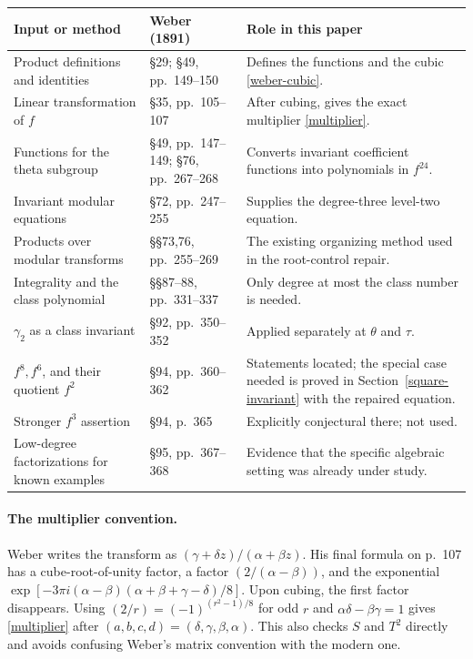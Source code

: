 \documentclass[11pt]{article}
\begin{document}
\begin{center}
\small
\begin{tabular}{>{\raggedright\arraybackslash}p{}
 >{\raggedright\arraybackslash}p{}
 >{\raggedright\arraybackslash}p{}}
\toprule
Input or method&Weber (1891)&Role in this paper\\
\midrule
Product definitions and identities&\S29; \S49,
pp.~149--150&Defines the functions and the cubic
\eqref{weber-cubic}.\\[4pt]
Linear transformation of \(f\)&\S35, pp.~105--107&After cubing,
gives the exact multiplier \eqref{multiplier}.\\[4pt]
Functions for the theta subgroup&\S49, pp.~147--149;
\S76, pp.~267--268&Converts invariant coefficient functions into
polynomials in \(f^{24}\).\\[4pt]
Invariant modular equations&\S72, pp.~247--255&Supplies the
degree-three level-two equation.\\[4pt]
Products over modular transforms&\S\S73,76, pp.~255--269&The
existing organizing method used in the root-control repair.\\[4pt]
Integrality and the class polynomial&\S\S87--88,
pp.~331--337&Only degree at most the class number is needed.\\[4pt]
\(\gamma_2\) as a class invariant&\S92,
pp.~350--352&Applied separately at \(\theta\) and \(\tau\).\\[4pt]
\(f^8,f^6\), and their quotient \(f^2\)&\S94,
pp.~360--362&Statements located; the special case needed is proved
in Section~\ref{square-invariant} with the repaired equation.\\[4pt]
Stronger \(f^3\) assertion&\S94, p.~365&Explicitly conjectural
there; not used.\\[4pt]
Low-degree factorizations for known examples&\S95, pp.~367--368&
Evidence that the specific algebraic setting was already under study.\\
\bottomrule
\end{tabular}
\end{center}

\paragraph{The multiplier convention.}
Weber writes the transform as
\((\gamma+\delta z)/(\alpha+\beta z)\). His final formula
on p.~107 has a cube-root-of-unity factor, a factor
\((2/(\alpha-\beta))\), and the exponential
\(\exp[-3\pi i(\alpha-\beta)(\alpha+\beta+\gamma-\delta)/8]\).
Upon cubing, the first factor disappears. Using
\((2/r)=(-1)^{(r^2-1)/8}\) for odd \(r\) and
\(\alpha\delta-\beta\gamma=1\) gives
\eqref{multiplier} after
\((a,b,c,d)=(\delta,\gamma,\beta,\alpha)\).
This also checks \(S\) and \(T^2\) directly and avoids confusing
Weber's matrix convention with the modern one.
\end{document}
